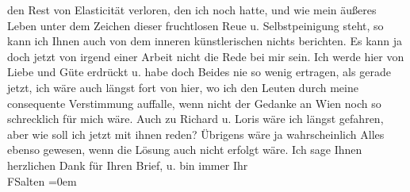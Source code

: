 \begin{ledgroupsized}[t]{13cm}
               den Rest von Elasticität verloren, den ich noch hatte, und wie mein äußeres
               Leben unter dem Zeichen dieser fruchtlosen
               Reue u. Selbstpeinigung steht, so kann ich Ihnen auch von dem inneren
               künstlerischen nichts berichten. Es kann ja doch jetzt von irgend einer 
               Arbeit nicht die Rede bei mir sein.\pend
           \pstart
           Ich werde hier von Liebe und {\pb}Güte erdrückt u. habe doch
               Beides nie so wenig ertragen, als gerade jetzt, ich wäre auch längst
               fort von hier, wo ich den Leuten durch meine consequente Verstimmung
               auffalle, wenn nicht der Gedanke an Wien noch so
               schrecklich für mich wäre.\pend
           \pstart
           Auch zu Richard u. Loris wäre ich
               längst gefahren, aber wie soll ich jetzt mit ihnen reden? Übrigens wäre ja wahrscheinlich
               Alles ebenso gewesen, wenn die Lösung auch nicht erfolgt wäre.\pend
           \pstart
           Ich sage Ihnen herzlichen Dank für Ihren Brief, u. {\pb}bin
               immer\pend
           \pstart
           Ihr {\\[\baselineskip]}\spacefill\mbox{FSalten}\pend
           \leftskip=0em{}
         
         \endnumbering{}\end{ledgroupsized}  \newcommand{\dateiname}{L03113}\newcommand{\titel}{Felix Salten an Arthur Schnitzler, 23. 8. 1892}\newcommand{\editorInnen}{Martin Anton Müller und Laura Untner}
      